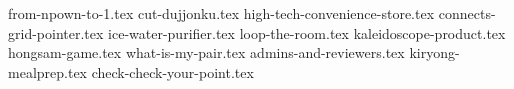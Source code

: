 \documentclass[11pt, aspectratio=169]{beamer}
\begin{document}
    {from-npown-to-1.tex}
    {cut-dujjonku.tex}
    {high-tech-convenience-store.tex}
    {connects-grid-pointer.tex}
    {ice-water-purifier.tex}
    {loop-the-room.tex}
    {kaleidoscope-product.tex}
    {hongsam-game.tex}
    {what-is-my-pair.tex}
    {admins-and-reviewers.tex}
    {kiryong-mealprep.tex}
    {check-check-your-point.tex}
    
\end{document}
